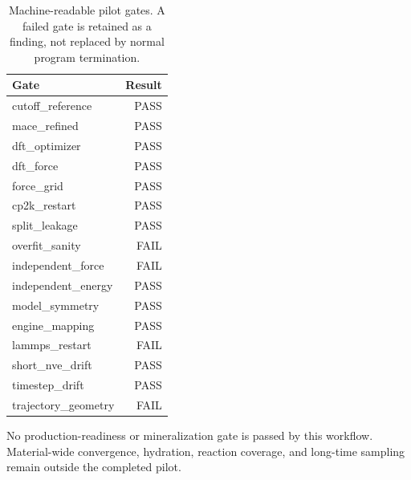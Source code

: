 \begin{table}[ht]\centering\small

\caption{Machine-readable pilot gates. A failed gate is retained as a finding, not replaced by normal program termination.}

\begin{tabular}{lr}\toprule Gate & Result\\\midrule

cutoff\_reference & PASS\\

mace\_refined & PASS\\

dft\_optimizer & PASS\\

dft\_force & PASS\\

force\_grid & PASS\\

cp2k\_restart & PASS\\

split\_leakage & PASS\\

overfit\_sanity & FAIL\\

independent\_force & FAIL\\

independent\_energy & PASS\\

model\_symmetry & PASS\\

engine\_mapping & PASS\\

lammps\_restart & FAIL\\

short\_nve\_drift & PASS\\

timestep\_drift & PASS\\

trajectory\_geometry & FAIL\\

\bottomrule\end{tabular}\end{table}

No production-readiness or mineralization gate is passed by this workflow. Material-wide convergence, hydration, reaction coverage, and long-time sampling remain outside the completed pilot.
